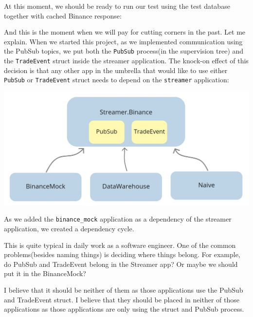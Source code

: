 \documentclass[
  oneside]{book}
\newenvironment{Shaded}{\begin{snugshade}}{\end{snugshade}}
\newcommand{\ErrorTok}[1]{\textcolor[rgb]{0.64,0.00,0.00}{\textbf{#1}}}
\newcommand{\ExtensionTok}[1]{#1}
\newcommand{\KeywordTok}[1]{\textcolor[rgb]{0.13,0.29,0.53}{\textbf{#1}}}
\newcommand{\NormalTok}[1]{#1}
\begin{document}
At this moment, we should be ready to run our test using the test database together with cached Binance response:

\begin{Shaded}
\end{Shaded}

And this is the moment when we will pay for cutting corners in the past. Let me explain. When we started this project, as we implemented communication using the PubSub topics, we put both the \texttt{PubSub} process(in the supervision tree) and the \texttt{TradeEvent} struct inside the streamer application. The knock-on effect of this decision is that any other app in the umbrella that would like to use either \texttt{PubSub} or \texttt{TradeEvent} struct needs to depend on the \texttt{streamer} application:

\begin{center}\includegraphics[width=1\linewidth]{images/chapter_16_03_relying_on_streamer} \end{center}

As we added the \texttt{binance\_mock} application as a dependency of the streamer application, we created a dependency cycle.

This is quite typical in daily work as a software engineer. One of the common problems(besides naming things) is deciding where things belong. For example, do PubSub and TradeEvent belong in the Streamer app? Or maybe we should put it in the BinanceMock?

I believe that it should be neither of them as those applications use the PubSub and TradeEvent struct. I believe that they should be placed in neither of those applications as those applications are only
using the struct and PubSub process.
\end{document}
